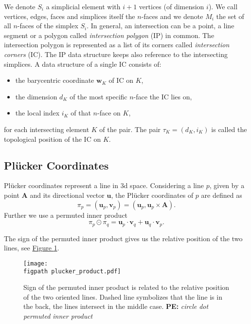 \documentclass{elsarticle}
\newcommand{\fig}[1]{\hyperref[#1]{Figure \ref{#1}}}
\newcommand{\figpath}{figures/}
\def\vc#1{\mathbf{\boldsymbol{#1}}}     %
\newcommand{\notePE}[1]{{\color{Orange} \textbf{PE: } \textit{#1}}}
\newcommand{\plucker}{Pl\"{u}cker }
\newcommand{\nface}{$n$-face }
\newcommand{\nfaces}{$n$-faces }
\begin{document}
We denote $S_i$ a simplicial element with $i+1$ vertices (of dimension $i$). We call vertices, edges, faces and simplices itself the \nfaces and we denote
$M_i$ the set of all \nfaces of the simplex $S_i$.
In general, an intersection can be a point, a line segment or a polygon called \emph{intersection polygon} (IP) in common.
The intersection polygon is represented as a list of its corners called \emph{intersection corners} (IC). The IP data structure keeps also 
reference to the intersecting simplices. A data structure of a single IC consists of:
\begin{itemize}
 \item the barycentric coordinate $\vc w_K$ of IC on $K$,
 \item the dimension $d_K$ of the most specific \nface the IC lies on,
 \item the local index $i_K$ of that \nface on $K$,
\end{itemize}
for each intersecting element $K$ of the pair. The pair $\tau_K = (d_K, i_K)$
is called the topological position of the IC on $K$.


\subsection{\plucker Coordinates}
\plucker coordinates represent a line in 3d space.
Considering a line $p$, given by a point $\vc A$ and its directional vector $\vc{u}$, 
the \plucker coordinates of $p$ are defined as
\[ \pi_p = (\vc{u}_p, \vc{v}_p) = (\vc{u}_p, \vc{u}_p\times \vc A). \]
Further we use a permuted inner product
\[\pi_p \odot \pi_q = \vc{u}_p\cdot \vc{v}_q + \vc{u}_q \cdot \vc{v}_p. \]

The sign of the permuted inner product gives us the relative position of the two lines, 
see \fig{fig:plucker_products}.



\begin{figure}[!htb]
  \begin{center}        
    \texttt{[image: \\figpath plucker\_product.pdf]}
  \end{center}
  \caption{Sign of the permuted inner product is related to the relative position of the two oriented lines. Dashed line symbolizes that the line is in the back, the lines intersect in the middle case.
           \notePE{circle dot permuted inner product}}
  \label{fig:plucker_products}
\end{figure}
\end{document}

